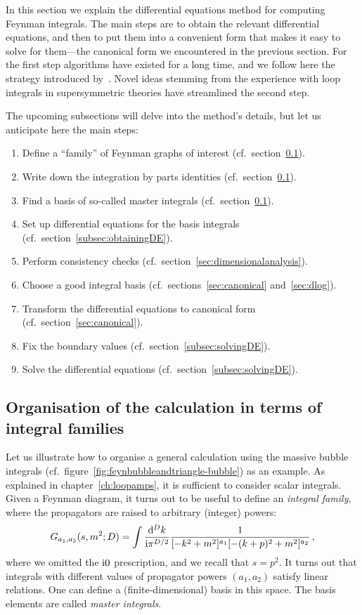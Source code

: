 In this section we explain the differential equations method for computing Feynman integrals.
The main steps are to obtain the relevant differential equations, and then to put them into a convenient form that makes it easy to solve for them---the canonical form we encountered in the previous section. For the first step algorithms have existed for a long time, and we follow here the strategy introduced by~\cite{ch4Laporta:2000dsw}.
Novel ideas stemming from the experience with loop integrals in supersymmetric theories have streamlined the second step.

The upcoming subsections will delve into the method's details, but let us anticipate here the main steps:
\begin{enumerate}
\item Define a ``family''  of Feynman graphs of interest (cf.~section~\ref{sec:integral_family}).
\item Write down the integration by parts identities (cf.~section~\ref{sec:integral_family}).
\item Find a basis of so-called master integrals (cf.~section~\ref{sec:integral_family}).
\item Set up differential equations for the basis integrals (cf.~section~\ref{subsec:obtainingDE}).
\item Perform consistency checks (cf.~section~\ref{sec:dimensionalanalysis}).
\item Choose a good integral basis (cf.~sections~\ref{sec:canonical} and~\ref{sec:dlog}).
\item Transform the differential equations to canonical form (cf.~section~\ref{sec:canonical}).
\item Fix the boundary values (cf.~section~\ref{subsec:solvingDE}).
\item Solve the differential equations (cf.~section~\ref{subsec:solvingDE}).
\end{enumerate}


 \subsection{Organisation of the calculation in terms of integral families}
 \label{sec:integral_family}

Let us illustrate how to organise a general calculation using the massive bubble integrals (cf.\ figure~\ref{fig:feynbubbleandtriangle-bubble}) as an example.
As explained in chapter~\ref{ch:loopamps}, it is sufficient to consider scalar integrals.
Given a Feynman diagram, it turns out to be useful to define an \emph{integral family}, where the propagators are raised to arbitrary (integer) powers:
\begin{align}\label{deffamily}
G_{a_1, a_2}(s,m^2;D) = \int \frac{\mathrm{d}^{D}k}{\mathrm{i} \pi^{D/2}} \frac{1}{[-k^2+m^2]^{a_1} [-(k+p)^2+m^2]^{a_2}} \,,
\end{align}
where we omitted the $\mathrm{i} 0$ prescription, and we recall that $s=p^2$.
It turns out that integrals with different values of propagator powers $(a_1, a_2)$ satisfy linear relations.
One can define a (finite-dimensional) basis in this space. The basis elements are called \emph{master integrals}.

